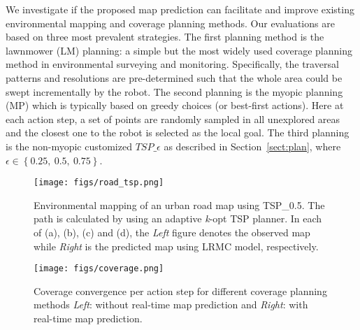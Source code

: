We investigate if the proposed map prediction can facilitate and improve existing environmental mapping and coverage planning methods. 
Our evaluations are based on three most prevalent strategies. 
The first planning method is the lawnmower (LM) planning: a simple but the most widely used coverage planning method in environmental surveying and monitoring.  Specifically, the traversal patterns and resolutions are pre-determined such that the whole area could be swept incrementally by the robot.
The second planning is the myopic planning (MP) which is typically based on greedy choices (or best-first actions). Here at each action step, a set of points are randomly sampled in all unexplored areas and the closest one to the robot is selected as the local goal. 
The third planning is the non-myopic customized $TSP\_\epsilon$ as described in Section~\ref{sect:plan}, 
where $\epsilon \in \left \{ 0.25,~0.5,~0.75 \right \}$.

\begin{figure*} \vspace{-3pt}
  \centering
  	{\label{fig:road_tsp}\texttt{[image: figs/road\_tsp.png]}}
  \caption{\small Environmental mapping of an urban road map using TSP\_{0.5}. The path is calculated by using an adaptive \textit{k}-opt TSP planner.
  In each of (a), (b), (c) and (d),  the \textit{Left} figure denotes the observed map while \textit{Right} is the predicted map using LRMC model, respectively. 
  } \vspace{-10pt}
\label{fig:road_tsp}  
\end{figure*}

\begin{figure}[t] 
  \centering
  	{\label{fig:coverage}\texttt{[image: figs/coverage.png]}}
  \caption{\small Coverage convergence per action step for different coverage planning methods \textit{Left}: without real-time map prediction and \textit{Right}: with real-time map prediction.
  } \vspace{-10pt}
\label{fig:coverage}  
\end{figure}


